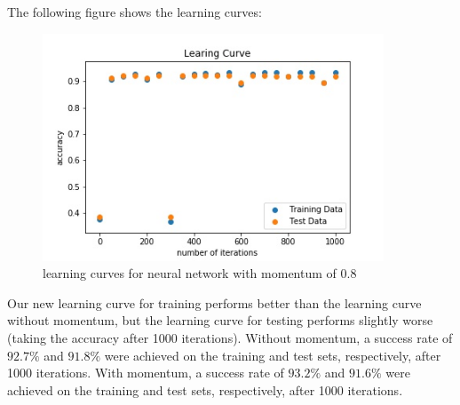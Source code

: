 \documentclass{article}
\begin{document}
   The following figure shows the learning curves:
 \begin{figure}[H] \centering
      \includegraphics[width=4in]{resources/part5}
      \caption{learning curves for neural network  with momentum of 0.8}
   \end{figure}

  Our new learning curve for training performs better than the learning curve without momentum,
 but the learning curve for testing performs slightly worse (taking the accuracy after 1000 iterations).
 Without momentum, a success rate of $ 92.7\%$ and $ 91.8\%$ were achieved on the training and test sets, respectively, 
 after 1000 iterations.
 With  momentum,  a success rate of $93.2\%$ and $91.6\%$ were achieved on the training and test sets, respectively, 
 after 1000 iterations.
\end{document}
